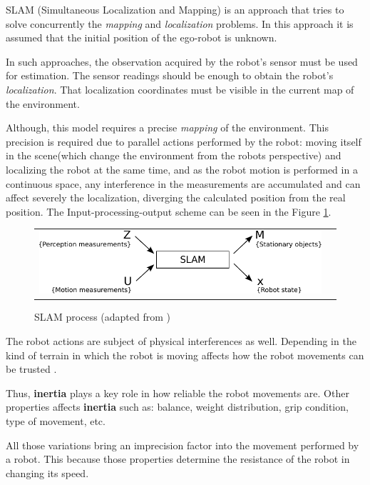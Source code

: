SLAM (Simultaneous Localization and Mapping) is an approach that tries to solve concurrently the \textit{mapping} and \textit{localization} problems\cite{VU-2009-454238}. In this approach it is assumed that the initial position of the ego-robot is unknown. 

In such approaches, the observation acquired by the robot's sensor must be used for estimation. The sensor readings should be enough to obtain the robot's \textit{localization}. That localization coordinates must be visible in the current map of the environment. 

Although, this model requires a precise \textit{mapping} of the environment. This precision is required due to parallel actions performed by the robot: moving itself in the scene(which change the environment from the robots perspective) and localizing the robot at the same time, and as the robot motion is performed in a continuous space, any interference in the measurements are accumulated and can affect severely the localization, diverging the calculated position from the real position. The Input-processing-output scheme can be seen in the Figure \ref{fig:perception:slam}.

\begin{figure}[h]
   \centering
     \begin{tabular}{lr}
       \includegraphics[scale=0.9]{img/fig:perception:slam}
     \end{tabular}
   \caption{SLAM process (adapted from \cite{Wang04a})}
   \label{fig:perception:slam}
\end{figure}

The robot actions are subject of physical interferences as well. Depending in the kind of terrain in which the robot is moving affects how the robot movements can be trusted \cite{DBLP:conf/icra/LenainTHM11}. 

Thus, \textbf{inertia} plays a key role in how reliable the robot movements are. Other properties affects \textbf{inertia} such as: balance, weight distribution, grip condition, type of movement, etc.

All those variations bring an imprecision factor into the movement performed by a robot. This because those properties determine the resistance of the robot in changing its speed.

